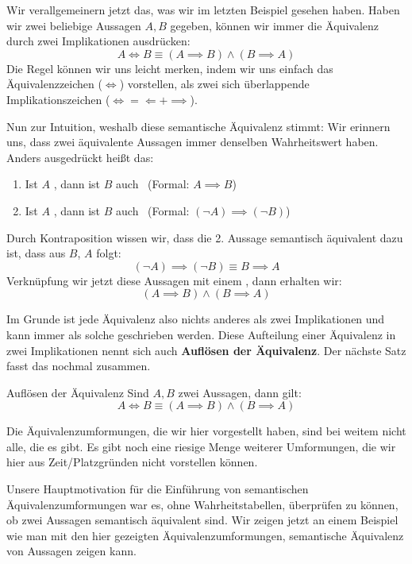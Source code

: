 \documentclass[../../main.tex]{subfiles}
\begin{document}
    Wir verallgemeinern jetzt das, was wir im letzten Beispiel gesehen haben.
     Haben wir zwei beliebige Aussagen $A,B$ gegeben, können wir immer die Äquivalenz
     durch zwei Implikationen ausdrücken:
    \[A \iff B \equiv (A \implies B) \land (B \implies A)\]
    Die Regel können wir uns leicht merken, indem wir uns einfach das Äquivalenzzeichen
    ($\iff$) vorstellen, als zwei sich überlappende Implikationszeichen ($\iff = \Longleftarrow + \implies$).

    Nun zur Intuition, weshalb diese semantische Äquivalenz stimmt: Wir erinnern uns, dass zwei äquivalente Aussagen 
    immer denselben Wahrheitswert haben. Anders ausgedrückt heißt das:
    \begin{enumerate}
        \item Ist $A$ \wahr, dann ist $B$ auch \wahr\  (Formal: $A \implies B$)
        \item Ist $A$ \falsch, dann ist $B$ auch \falsch\  (Formal: $(\lnot A) \implies (\lnot B)$)
    \end{enumerate}
    Durch Kontraposition wissen wir, dass die 2. Aussage semantisch äquivalent dazu ist,
    dass aus $B$, $A$ folgt:
    \[(\lnot A) \implies (\lnot B) \equiv B \implies A\]
    Verknüpfung wir jetzt diese Aussagen mit einem , dann erhalten wir:
    \[(A \implies B) \land (B \implies A)\]
    
    Im Grunde ist jede Äquivalenz also nichts anderes als zwei Implikationen und kann immer als solche geschrieben werden. 
    Diese Aufteilung einer Äquivalenz in zwei Implikationen nennt sich auch \textbf{Auflösen der Äquivalenz}.
    Der nächste Satz fasst das nochmal zusammen.
    
    \begin{theorem}{Auflösen der Äquivalenz}
    Sind $A,B$ zwei Aussagen, dann gilt:
        \[ A \iff B \equiv (A \implies B) \land (B \implies A)\]
    \end{theorem}

    Die Äquivalenzumformungen, die wir hier vorgestellt haben, sind bei weitem nicht alle, die es gibt. Es gibt
    noch eine riesige Menge weiterer Umformungen, die wir hier aus Zeit/Platzgründen nicht vorstellen können.
    
    Unsere Hauptmotivation für die Einführung von semantischen Äquivalenzumformungen war es, ohne
    Wahrheitstabellen, überprüfen zu können, ob zwei Aussagen semantisch äquivalent sind. 
    Wir zeigen jetzt an einem Beispiel wie man mit den hier gezeigten Äquivalenzumformungen, semantische Äquivalenz von 
    Aussagen zeigen kann.
\end{document}

